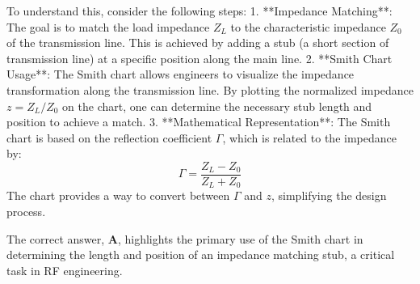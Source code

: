 To understand this, consider the following steps:
1. **Impedance Matching**: The goal is to match the load impedance \( Z_L \) to the characteristic impedance \( Z_0 \) of the transmission line. This is achieved by adding a stub (a short section of transmission line) at a specific position along the main line.
2. **Smith Chart Usage**: The Smith chart allows engineers to visualize the impedance transformation along the transmission line. By plotting the normalized impedance \( z = Z_L / Z_0 \) on the chart, one can determine the necessary stub length and position to achieve a match.
3. **Mathematical Representation**: The Smith chart is based on the reflection coefficient \( \Gamma \), which is related to the impedance by:
   \[
   \Gamma = \frac{Z_L - Z_0}{Z_L + Z_0}
   \]
   The chart provides a way to convert between \( \Gamma \) and \( z \), simplifying the design process.

The correct answer, \textbf{A}, highlights the primary use of the Smith chart in determining the length and position of an impedance matching stub, a critical task in RF engineering.

